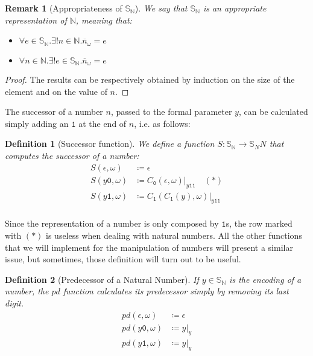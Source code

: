 \documentclass[10pt]{amsart}
\newcommand{\zero}{\mathtt{0}}
\newcommand{\one}{\mathtt{1}}
\newcommand{\vtwo}{y}
\newcommand{\none}{n}
\newcommand{\NN}{\mathbb{N}}
\renewcommand{\SS}{\mathbb{S}}
\newcommand{\oone}{\omega}
\newcommand{\pred}{pd}
\newtheorem{defn}{Definition}
\newtheorem{remark}{Remark}
\begin{document}
\begin{remark}[Appropriateness of $\SS_\NN$]
We say that $\SS_\NN$ is an appropriate representation of $\NN$, meaning that:
\begin{itemize}
\item $\forall e \in \SS_\NN. \exists! \none \in \NN. \overline \none_\oone = e$
\item $\forall n \in \NN. \exists! e \in \SS_\NN. \overline \none_\oone = e$
\end{itemize}
\end{remark}

\begin{proof}
The results can be respectively obtained by induction on the size of the element and on the value of $n$.
\end{proof}


The successor of a number $n$, passed to the formal parameter $\vtwo$, can be calculated simply adding an $\one$ at the end of $n$, i.e. as follows:

\begin{defn}[Successor function]
We define a function $S: \SS_\NN \longrightarrow \SS_NN$ that computes the successor of a number:
\begin{align*}
S(\epsilon, \oone) &\coloneqq \epsilon\\
S(\vtwo\zero, \oone)&\coloneqq  C_\zero(\epsilon, \oone)|_{\vtwo\one\one}\quad(*)\\
S(\vtwo\one, \oone)&\coloneqq C_\one(C_\one(\vtwo), \oone)|_{\vtwo\one\one}\\
\end{align*}
\end{defn}

Since the representation of a number is only composed by $\one$s, the row marked with $(*)$ is useless when dealing with natural numbers. All the other functions that we will implement for the manipulation of numbers will present a similar issue, but sometimes, those definition will turn out to be useful.


\begin{defn}[Predecessor of a Natural Number]
If $\vtwo\in \SS_\NN$ is the encoding of a number, the $pd$ function calculates its predecessor simply by removing its last digit.
\begin{align*}
\pred(\epsilon, \omega) &\coloneqq \epsilon\\
\pred(\vtwo \zero, \oone) &\coloneqq \vtwo|_{\vtwo}\\
\pred(\vtwo \one, \oone) &\coloneqq \vtwo|_{\vtwo}\\
\end{align*}
\end{defn}
\end{document}
